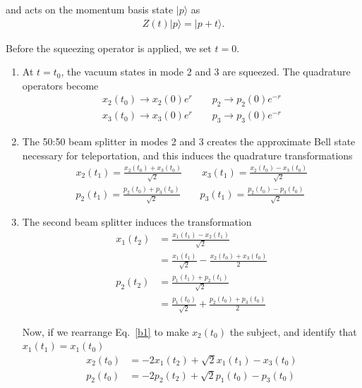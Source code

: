 \documentclass[pra,
superscriptaddress,
 amsmath,amssymb,
 aps,twocolumn]{revtex4-1}
\newcommand{\ket}[1]{|{#1}\rangle}
\begin{document}
\noindent and acts on the momentum basis state $\ket{p}$ as
\begin{eqnarray}
Z(t)\ket{p}=\ket{p+t}.
\end{eqnarray}




Before the squeezing operator is applied, we set $t=0$.
\begin{enumerate}
\item At $t=t_0$, the vacuum states in mode 2 and 3 are squeezed. The quadrature operators become
\begin{align}
x_2(t_0) \rightarrow x_2(0) e^{r} \qquad p_2 \rightarrow p_2(0) e^{-r} \\
x_3(t_0) \rightarrow x_3(0) e^{r} \qquad p_3 \rightarrow p_3(0) e^{-r}
\end{align}
% 
\item The 50:50 beam splitter in modes 2 and 3 creates the approximate
Bell state necessary for teleportation, and this induces the quadrature
transformations
\begin{align}
x_2 (t_1) = \frac{x_2(t_0) + x_3(t_0)}{\sqrt 2} \qquad x_3 (t_1) = \frac{x_2(t_0) - x_3(t_0)}{\sqrt 2} \nonumber\\
p_2 (t_1) = \frac{p_2(t_0) + p_3(t_0)}{\sqrt 2} \qquad p_3 (t_1) = \frac{p_2(t_0) - p_3(t_0)}{\sqrt 2}
\end{align}
\item The second beam splitter induces the transformation
\begin{align}
x_1 (t_2) &= \frac{x_1(t_1) - x_2(t_1)}{\sqrt 2} \\
		  &= \frac{x_1(t_1)}{\sqrt 2} - \frac{x_2(t_0) + x_3(t_0)}{2} \label{b1}\\
p_2 (t_2) &= \frac{p_1(t_1) + p_2(t_1)}{\sqrt 2} \\
		  &=\frac{p_1 (t_0)}{\sqrt 2} +  \frac{p_2(t_0) + p_3(t_0)}{ 2} 
\end{align}
% 

\noindent Now, if we rearrange Eq.~\eqref{b1} to make $x_2(t_0)$ the subject, and identify that $x_1(t_1) = x_1 (t_0)$
\begin{align}
x_2(t_0) &= -2 x_1(t_2)+ \sqrt 2x_1(t_1) - x_3(t_0) \\
p_2(t_0) &= -  2p_2(t_2)  + \sqrt 2 p_1 (t_0) - p_3 (t_0)
\end{align}


\end{enumerate}
\end{document}
